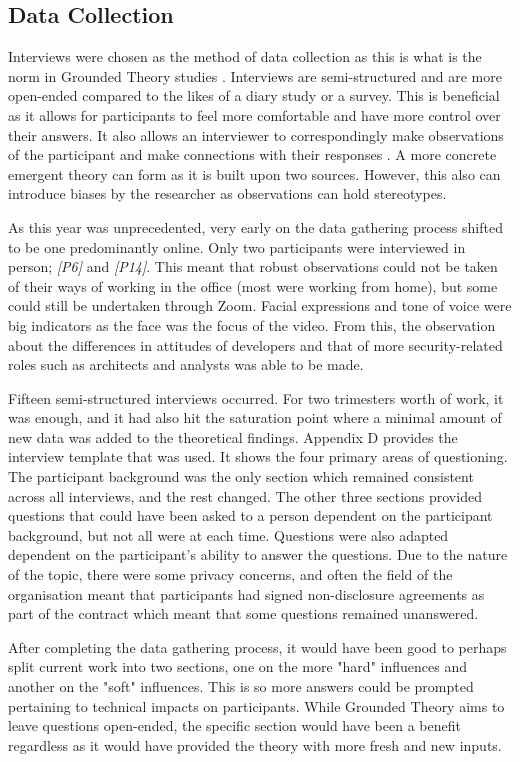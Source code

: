 \subsection{Data Collection}
Interviews were chosen as the method of data collection as this is what is the norm in Grounded Theory studies \cite{geeks}. Interviews are semi-structured and are more open-ended compared to the likes of a diary study or a survey. This is beneficial as it allows for participants to feel more comfortable and have more control over their answers. It also allows an interviewer to correspondingly make observations of the participant and make connections with their responses \cite{geeks}. A more concrete emergent theory can form as it is built upon two sources. However, this also can introduce biases by the researcher as observations can hold stereotypes. 
\newline
\par
 As this year was unprecedented, very early on the data gathering process shifted to be one predominantly online. Only two participants were interviewed in person; \textit{[P6]} and \textit{[P14]}. This meant that robust observations could not be taken of their ways of working in the office (most were working from home), but some could still be undertaken through Zoom. Facial expressions and tone of voice were big indicators as the face was the focus of the video. From this, the observation about the differences in attitudes of developers and that of more security-related roles such as architects and analysts was able to be made. 
\newline
\par 
Fifteen semi-structured interviews occurred. For two trimesters worth of work, it was enough, and it had also hit the saturation point where a minimal amount of new data was added to the theoretical findings. Appendix D provides the interview template that was used. It shows the four primary areas of questioning. The participant background was the only section which remained consistent across all interviews, and the rest changed. The other three sections provided questions that could have been asked to a person dependent on the participant background, but not all were at each time. Questions were also adapted dependent on the participant's ability to answer the questions. Due to the nature of the topic, there were some privacy concerns, and often the field of the organisation meant that participants had signed non-disclosure agreements as part of the contract which meant that some questions remained unanswered.  
\newline
\par
After completing the data gathering process,  it would have been good to perhaps split current work into two sections, one on the more "hard" influences and another on the "soft" influences. This is so more answers could be prompted pertaining to technical impacts on participants. While Grounded Theory aims to leave questions open-ended, the specific section would have been a benefit regardless as it would have provided the theory with more fresh and new inputs. 

